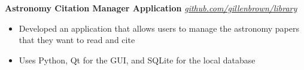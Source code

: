 \documentclass[10pt]{article}
\newcommand{\header}[1]{\vspace{0.7em}\par \textbf{\large #1}\strut\hrule\vspace{-0.6em}}
\newcommand{\actionHeader}[2]{\vspace{0.3em}\textbf{#1} \hfill #2}
\newcommand{\actionHeaderSecondLine}[2]{\newline \textit{#1} \hfill #2}
\begin{document}

\actionHeader{Astronomy Citation Manager Application}{}
\actionHeaderSecondLine{\href{https://github.com/gillenbrown/library/}{github.com/gillenbrown/library}}
\begin{itemize}
    \item Developed an application that allows users to manage the astronomy papers that they want to read and cite
    \item Uses Python, Qt for the GUI, and SQLite for the local database
\end{itemize}



\end{document}
